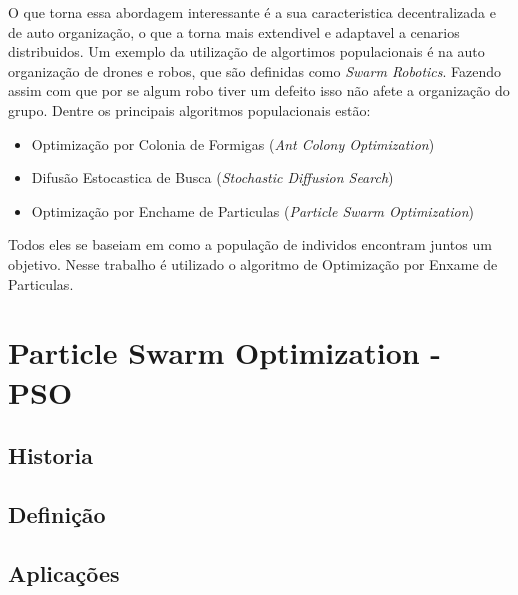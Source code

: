         O que torna essa abordagem interessante é a sua caracteristica decentralizada e de auto organização, o que a torna mais extendivel e adaptavel a cenarios distribuidos. Um exemplo da utilização de algortimos populacionais é na auto organização de drones e robos, que são definidas como \textit{Swarm Robotics}. Fazendo assim com que por se algum robo tiver um defeito isso não afete a organização do grupo. \newline
        Dentre os principais algoritmos populacionais estão:
        \begin{itemize}
            \item Optimização por Colonia de Formigas (\textit{Ant Colony Optimization}) 
            \item Difusão Estocastica de Busca (\textit{Stochastic Diffusion Search})
            \item Optimização por Enchame de Particulas (\textit{Particle Swarm Optimization})
        \end{itemize}
        
        Todos eles se baseiam em como a população de individos encontram juntos um objetivo. Nesse trabalho é utilizado o algoritmo de Optimização por Enxame de Particulas. 



\section{Particle Swarm Optimization - PSO}

    \subsection{Historia}


    \subsection{Definição}


    \subsection{Aplicações}


